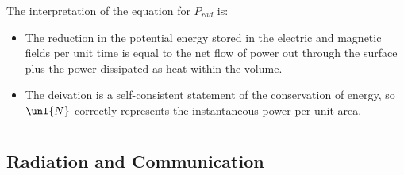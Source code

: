 \documentclass[a4paper, 11pt, normalem]{report}
\begin{document}
The interpretation of the equation for $P_{rad}$ is:
\begin{itemize}
	\item The reduction in the potential energy stored in the electric and magnetic fields per unit time is equal to the net flow of power out through the surface plus the power dissipated as heat within the volume.
	\item The deivation is a self-consistent statement of the conservation of energy, so $\unl{N}$ correctly represents the instantaneous power per unit area.
\end{itemize}

\chapter{}
\section{Radiation and Communication}
\end{document}
